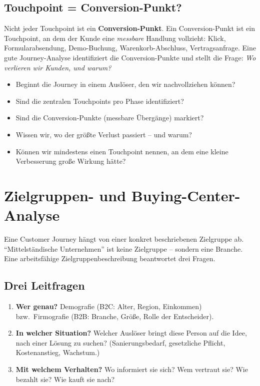 \documentclass[11pt,a4paper,oneside]{article}
\newcommand{\fachbegriff}[1]{\textbf{#1}}
\begin{document}
\subsection{Touchpoint = Conversion-Punkt?}

Nicht jeder Touchpoint ist ein \fachbegriff{Conversion-Punkt}. Ein Conversion-Punkt ist ein Touchpoint, an dem der Kunde eine \emph{messbare} Handlung vollzieht: Klick, Formularabsendung, Demo-Buchung, Warenkorb-Abschluss, Vertragsanfrage. Eine gute Journey-Analyse identifiziert die Conversion-Punkte und stellt die Frage: \emph{Wo verlieren wir Kunden, und warum?}

\begin{merkbox}
\begin{itemize}
  \item Beginnt die Journey in einem Auslöser, den wir nachvollziehen können?
  \item Sind die zentralen Touchpoints pro Phase identifiziert?
  \item Sind die Conversion-Punkte (messbare Übergänge) markiert?
  \item Wissen wir, wo der größte Verlust passiert -- und warum?
  \item Können wir mindestens einen Touchpoint nennen, an dem eine kleine Verbesserung große Wirkung hätte?
\end{itemize}
\end{merkbox}

\section{Zielgruppen- und Buying-Center-Analyse}

Eine Customer Journey hängt von einer konkret beschriebenen Zielgruppe ab. ``Mittelständische Unternehmen'' ist keine Zielgruppe -- sondern eine Branche. Eine arbeitsfähige Zielgruppenbeschreibung beantwortet drei Fragen.

\subsection{Drei Leitfragen}

\begin{enumerate}
  \item \textbf{Wer genau?} Demografie (B2C: Alter, Region, Einkommen) bzw.\ Firmografie (B2B: Branche, Größe, Rolle der Entscheider).
  \item \textbf{In welcher Situation?} Welcher Auslöser bringt diese Person auf die Idee, nach einer Lösung zu suchen? (Sanierungsbedarf, gesetzliche Pflicht, Kostenanstieg, Wachstum.)
  \item \textbf{Mit welchem Verhalten?} Wo informiert sie sich? Wem vertraut sie? Wie bezahlt sie? Wie kauft sie nach?
\end{enumerate}
\end{document}
